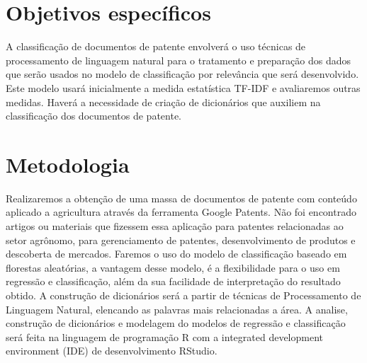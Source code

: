 \section{Objetivos específicos}
A classificação de documentos de patente envolverá o uso técnicas de processamento de linguagem natural para o tratamento e preparação dos dados que serão usados no modelo de classificação por relevância que será desenvolvido. Este modelo usará inicialmente a medida estatística TF-IDF e avaliaremos outras medidas. Haverá a necessidade de criação de dicionários que auxiliem na classificação dos documentos de patente.

\section{Metodologia}
Realizaremos a obtenção de uma massa de documentos de patente com conteúdo aplicado a agricultura através da ferramenta Google Patents. Não foi encontrado artigos ou materiais que fizessem essa aplicação para patentes relacionadas ao setor agrônomo, para gerenciamento de patentes, desenvolvimento de produtos e descoberta de mercados. Faremos o uso do modelo de classificação baseado em florestas aleatórias, a vantagem desse modelo, é a flexibilidade para o uso em regressão e classificação, além da sua facilidade de interpretação do resultado obtido.  A construção de dicionários será a partir de técnicas de Processamento de Linguagem Natural, elencando as palavras mais relacionadas a área. A analise, construção de dicionários e modelagem do modelos de regressão e classificação será feita na linguagem de programação R com a integrated development environment (IDE) de desenvolvimento RStudio.

